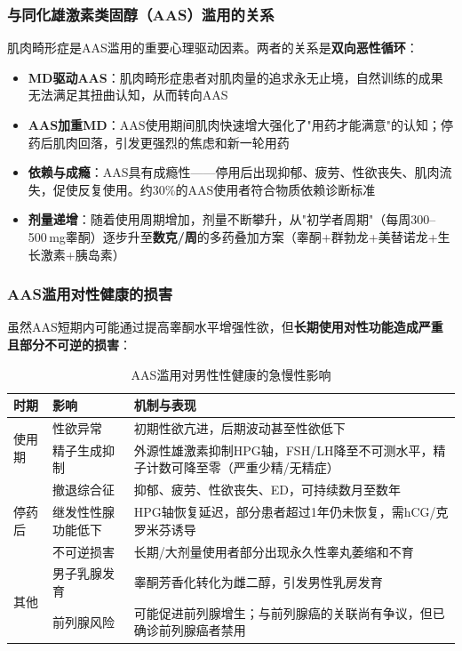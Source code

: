 \subsubsection{与同化雄激素类固醇（AAS）滥用的关系}

肌肉畸形症是AAS滥用的重要心理驱动因素。两者的关系是\textbf{双向恶性循环}：

\begin{itemize}[leftmargin=2cm]
	\item \textbf{MD驱动AAS}：肌肉畸形症患者对肌肉量的追求永无止境，自然训练的成果无法满足其扭曲认知，从而转向AAS
	\item \textbf{AAS加重MD}：AAS使用期间肌肉快速增大强化了"用药才能满意"的认知；停药后肌肉回落，引发更强烈的焦虑和新一轮用药
	\item \textbf{依赖与成瘾}：AAS具有成瘾性——停用后出现抑郁、疲劳、性欲丧失、肌肉流失，促使反复使用。约30\%的AAS使用者符合物质依赖诊断标准
	\item \textbf{剂量递增}：随着使用周期增加，剂量不断攀升，从"初学者周期"（每周300--500\,mg睾酮）逐步升至\textbf{数克/周}的多药叠加方案（睾酮+群勃龙+美替诺龙+生长激素+胰岛素）
\end{itemize}

\subsubsection{AAS滥用对性健康的损害}

虽然AAS短期内可能通过提高睾酮水平增强性欲，但\textbf{长期使用对性功能造成严重且部分不可逆的损害}：

\begin{table}[htbp]
\centering
\caption{AAS滥用对男性性健康的急慢性影响}
\label{tab:aas_sexual_effects}
\begin{tabularx}{\textwidth}{@{}llX@{}}
    \toprule
    \textbf{时期} & \textbf{影响} & \textbf{机制与表现} \\
    \midrule
    \multirow{2}{*}{使用期} & 性欲异常 & 初期性欲亢进，后期波动甚至性欲低下 \\
     & 精子生成抑制 & 外源性雄激素抑制HPG轴，FSH/LH降至不可测水平，精子计数可降至零（严重少精/无精症） \\
    \midrule
    \multirow{3}{*}{停药后} & 撤退综合征 & 抑郁、疲劳、性欲丧失、ED，可持续数月至数年 \\
     & 继发性性腺功能低下 & HPG轴恢复延迟，部分患者超过1年仍未恢复，需hCG/克罗米芬诱导 \\
     & 不可逆损害 & 长期/大剂量使用者部分出现永久性睾丸萎缩和不育 \\
    \midrule
    \multirow{2}{*}{其他} & 男子乳腺发育 & 睾酮芳香化转化为雌二醇，引发男性乳房发育 \\
     & 前列腺风险 & 可能促进前列腺增生；与前列腺癌的关联尚有争议，但已确诊前列腺癌者禁用 \\
    \bottomrule
\end{tabularx}
\end{table}

